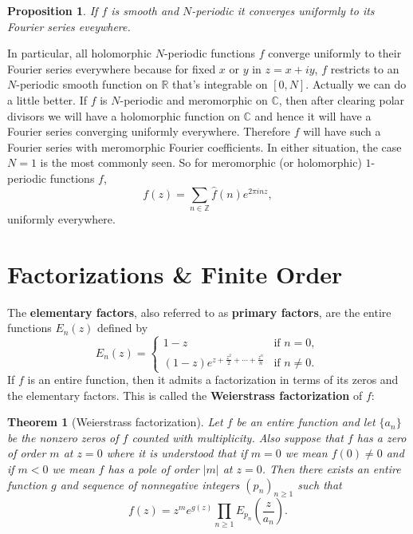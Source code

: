 \documentclass[12pt]{book}
\newtheorem{theorem}{Theorem}[section]
\newtheorem{proposition}{Proposition}[section]
\theoremstyle{definition}\newframedtheorem{method}{Method}
\newcommand{\Z}{\mathbb{Z}}
\newcommand{\R}{\mathbb{R}}
\newcommand{\C}{\mathbb{C}}
\newcommand{\<}{\langle}
\renewcommand{\>}{\rangle}
\begin{document}
      \begin{proposition}
        If $f$ is smooth and $N$-periodic it converges uniformly to its Fourier series eveywhere.
      \end{proposition}

      In particular, all holomorphic $N$-periodic functions $f$ converge uniformly to their Fourier series everywhere because for fixed $x$ or $y$ in $z = x+iy$, $f$ restricts to an $N$-periodic smooth function on $\R$ that's integrable on $[0,N]$. Actually we can do a little better. If $f$ is $N$-periodic and meromorphic on $\C$, then after clearing polar divisors we will have a holomorphic function on $\C$ and hence it will have a Fourier series converging uniformly everywhere. Therefore $f$ will have such a Fourier series with meromorphic Fourier coefficients. In either situation, the case $N = 1$ is the most commonly seen. So for meromorphic (or holomorphic) $1$-periodic functions $f$,
      \[
        f(z) = \sum_{n \in \Z}\hat{f}(n)e^{2\pi inz},
      \]
      uniformly everywhere.
  \section{Factorizations \& Finite Order}\label{append:Factorizations_and_Finite_Order}
    The \textbf{elementary factors}, also referred to as \textbf{primary factors}, are the entire functions $E_{n}(z)$ defined by
    \[
      E_{n}(z) = \begin{cases} 1-z & \text{if } n = 0, \\ (1-z)e^{z+\frac{z^{2}}{2}+\cdots+\frac{z^{n}}{n}} & \text{if } n \neq 0. \end{cases}
    \]
    If $f$ is an entire function, then it admits a factorization in terms of its zeros and the elementary factors. This is called the \textbf{Weierstrass factorization} of $f$:

    \begin{theorem}[Weierstrass factorization]
      Let $f$ be an entire function and let $\{a_{n}\}$ be the nonzero zeros of $f$ counted with multiplicity. Also suppose that $f$ has a zero of order $m$ at $z = 0$ where it is understood that if $m = 0$ we mean $f(0) \neq 0$ and if $m < 0$ we mean $f$ has a pole of order $|m|$ at $z = 0$. Then there exists an entire function $g$ and sequence of nonnegative integers $(p_{n})_{n \ge 1}$ such that
      \[
        f(z) = z^{m}e^{g(z)}\prod_{n \ge 1}E_{p_{n}}\left(\frac{z}{a_{n}}\right).
      \]
    \end{theorem}
\end{document}
